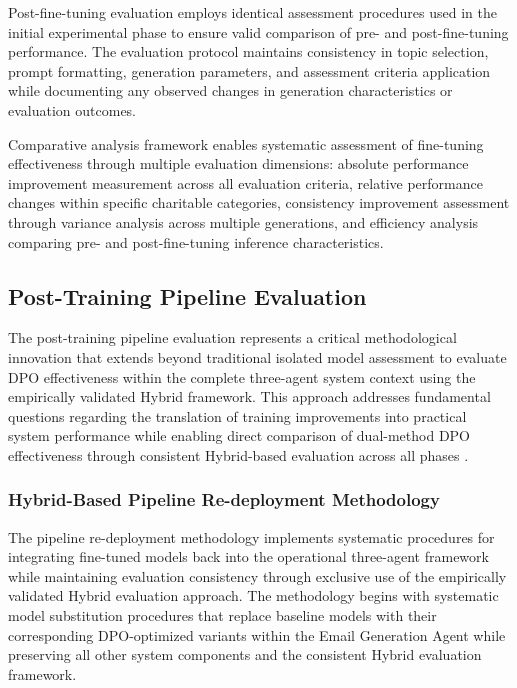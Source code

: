 Post-fine-tuning evaluation employs identical assessment procedures used in the initial experimental phase to ensure valid comparison of pre- and post-fine-tuning performance. The evaluation protocol maintains consistency in topic selection, prompt formatting, generation parameters, and assessment criteria application while documenting any observed changes in generation characteristics or evaluation outcomes.

Comparative analysis framework enables systematic assessment of fine-tuning effectiveness through multiple evaluation dimensions: absolute performance improvement measurement across all evaluation criteria, relative performance changes within specific charitable categories, consistency improvement assessment through variance analysis across multiple generations, and efficiency analysis comparing pre- and post-fine-tuning inference characteristics.

\subsection{Post-Training Pipeline Evaluation}
\label{sec:post-training-pipeline}

The post-training pipeline evaluation represents a critical methodological innovation that extends beyond traditional isolated model assessment to evaluate DPO effectiveness within the complete three-agent system context using the empirically validated Hybrid framework. This approach addresses fundamental questions regarding the translation of training improvements into practical system performance while enabling direct comparison of dual-method DPO effectiveness through consistent Hybrid-based evaluation across all phases \cite{chen2024meta_evaluation, wang2024dynamic_evaluation}.

\subsubsection{Hybrid-Based Pipeline Re-deployment Methodology}

The pipeline re-deployment methodology implements systematic procedures for integrating fine-tuned models back into the operational three-agent framework while maintaining evaluation consistency through exclusive use of the empirically validated Hybrid evaluation approach. The methodology begins with systematic model substitution procedures that replace baseline models with their corresponding DPO-optimized variants within the Email Generation Agent while preserving all other system components and the consistent Hybrid evaluation framework.

